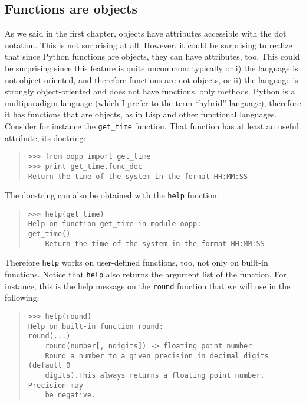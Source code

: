 \documentclass[10pt,english]{article}
\begin{document}

\hypertarget{functions-are-objects}{}
\subsection*{Functions are objects}

As we said in the first chapter, objects have attributes accessible with the 
dot notation. This is not surprising at all. However, it could be
surprising to realize that since Python functions are objects, they
can have attributes, too. This could be surprising since this feature is quite 
uncommon: typically or i) the language is
not object-oriented, and therefore functions are not objects, or ii)
the language is strongly object-oriented and does not have functions, only 
methods. Python is a multiparadigm language (which I prefer to the
term ``hybrid'' language), therefore it has functions that are objects,
as in Lisp and other functional languages. 
Consider for instance the \texttt{get{\_}time} function.
That function has at least an useful attribute, its doctring:
\begin{quote}
\begin{verbatim}>>> from oopp import get_time
>>> print get_time.func_doc
Return the time of the system in the format HH:MM:SS\end{verbatim}
\end{quote}

The docstring can also be obtained with the \texttt{help} function:
\begin{quote}
\begin{verbatim}>>> help(get_time)
Help on function get_time in module oopp:
get_time()
    Return the time of the system in the format HH:MM:SS\end{verbatim}
\end{quote}

Therefore \texttt{help} works on user-defined functions, too, not only on
built-in functions. Notice that \texttt{help} also returns the argument list of 
the function. For instance, this is
the help message on the \texttt{round} function that we will use in the
following:
\begin{quote}
\begin{verbatim}>>> help(round)
Help on built-in function round:
round(...)
    round(number[, ndigits]) -> floating point number
    Round a number to a given precision in decimal digits (default 0 
    digits).This always returns a floating point number.  Precision may 
    be negative.\end{verbatim}
\end{quote}
\end{document}
